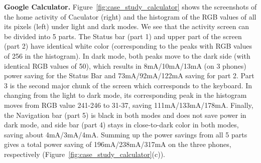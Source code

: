 {\bf Google Calculator.}
Figure~\ref{fig:case_study_calculator} shows the screenshots of the home
activity of Caculator (right) and the histogram of the RGB values of
all its pixels (left) under light and dark modes.  We see that the
activity screen can be divided into 5 parts. The Status bar (part 1)
and upper part of the screen (part 2) have identical white color 
(corresponding to the peaks with RGB values of 256 in the histogram).
In dark mode, both peaks move to the dark side (with identical RGB values of 50),
which results in 8mA/10mA/13mA (on 3 phones) power saving for the Status Bar and
73mA/92mA/122mA saving for part 2.
Part 3 is the second major chunk of the screen which corresponds to the
keyboard.  In changing from the light to dark mode, its
corresponding peak in the histogram moves from RGB value 241-246  to 31-37,
saving 111mA/133mA/178mA.
%
Finally, the Navigation bar (part 5) is black in both modes
and does not save power in dark mode,
and side bar (part 4) stays in close-to-dark
color in both modes, saving about 4mA/3mA/4mA.
Summing up the power savings from all 5 parts 
gives a total power saving of 196mA/238mA/317mA
on the three phones, respectively (Figure~\ref{fig:case_study_calculator}(c)).

